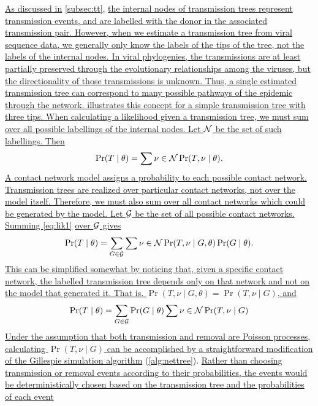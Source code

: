{\uline{As discussed in} \cref{subsec:tt}, \uline{the internal nodes of
transmission trees represent transmission events, and are labelled with the
donor in the associated transmission pair. However, when we estimate a
transmission tree from viral sequence data, we generally only know the labels
of the tips of the tree, not the labels of the internal nodes. In viral
phylogenies, the transmissions are at least partially preserved through the
evolutionary relationships among the viruses, but the directionality of those
transmissions is unknown. Thus, a single estimated transmission tree can
correspond to many possible pathways of the epidemic through the network.
} \uline{illustrates this concept for a simple transmission tree
with three tips. When calculating a likelihood given a transmission tree, we
must sum over all possible labellings of the internal nodes. Let $\mathcal{N}$ be the
set of such labellings. Then}
\begin{align}
    \Pr(T \mid \theta) = \sum{\nu \in \mathcal{N}} \Pr(T, \nu \mid \theta).
    \label{eq:lik1}
\end{align}
\uline{A contact network model assigns a probability to each possible contact
network. Transmission trees are realized over particular contact networks, not
over the model itself. Therefore, we must also sum over all contact networks
which could be generated by the model. Let $\mathcal{G}$ be the set of all possible
contact networks. Summing } \cref{eq:lik1} \uline{over $\mathcal{G}$ gives}
\begin{align}
    \Pr(T \mid \theta) = \sum_{G \in \mathcal{G}} \sum{\nu \in \mathcal{N}} 
        \Pr(T, \nu \mid G, \theta) \Pr(G \mid \theta).
    \label{eq:lik2}
\end{align}
\uline{This can be simplified somewhat by noticing that, given a specific
contact network, the labelled transmission tree depends only on that network
and not on the model that generated it. That is, $\Pr(T, \nu \mid G, \theta) =
\Pr(T, \nu \mid G)$, and}
\begin{align}
    \Pr(T \mid \theta) = \sum_{G \in \mathcal{G}} \Pr(G \mid \theta) \sum{\nu \in \mathcal{N}} 
        \Pr(T, \nu \mid G)
    \label{eq:lik3}
\end{align}
\uline{Under the assumption that both transmission and removal are Poisson
processes, calculating $\Pr(T, \nu \mid G)$ can be accomplished by a
straightforward modification of the Gillespie simulation algorithm} 
(\cref{alg:nettree}). \uline{Rather than choosing transmission or removal
events according to their probabilities, the events would be deterministically
chosen based on the transmission tree and the probabilities of each event
}}
